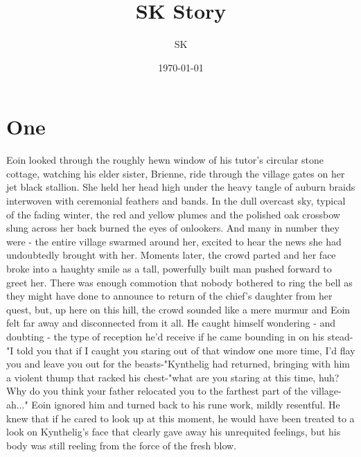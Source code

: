 \documentclass[twoside]{article}
\title{SK Story}
\author{SK}
\date{\today}
\begin{document}

\section{One}

Eoin looked through the roughly hewn window of his tutor's circular stone cottage, watching his elder sister, Brienne, ride through the village gates on her jet black stallion. She held her head high under the heavy tangle of auburn braids interwoven with ceremonial feathers and bands. In the dull overcast sky, typical of the fading winter, the red and yellow plumes and the polished oak crossbow slung across her back burned the eyes of onlookers. And many in number they were - the entire village swarmed around her, excited to hear the news she had undoubtedly brought with her. Moments later, the crowd parted and her face broke into a haughty smile as a tall, powerfully built man pushed forward to greet her. There was enough commotion that nobody bothered to ring the bell as they might have done to announce to return of the chief's daughter from her quest, but, up here on this hill, the crowd sounded like a mere murmur and Eoin felt far away and disconnected from it all. He caught himself wondering  - and doubting - the type of reception he'd receive if he came bounding in on his stead-
"I told you that if I caught you staring out of that window one more time, I'd flay you and leave you out for the beasts-"Kynthelig had returned, bringing with him a violent thump that racked his chest-"what are you staring at this time, huh? Why do you think your father relocated you to the farthest part of the village-ah..."
Eoin ignored him and turned back to his rune work, mildly resentful. He knew that if he cared to look up at this moment, he would have been treated to a look on Kynthelig's face that clearly gave away his unrequited feelings, but his body was still reeling from the force of the fresh blow.
\end{document}
